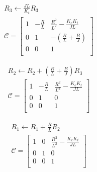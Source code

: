 \begin{equation*}
  \begin{aligned}
    &R_3 \leftarrow \tfrac{JL}{K_t} R_3\\
    &\mathcal{C} = 
    \begin{bmatrix}
      1           &  -\frac{R}{L}     &  \frac{R^2}{L^2}-\frac{K_e K_t}{JL}    \\
      0           &   1               &  -\left(\frac{R}{L}+\frac{B}{J}\right) \\
      0           &   0               &  1                                     \\
    \end{bmatrix}
  \end{aligned}
\end{equation*}

\begin{equation*}
  \begin{aligned}
    &R_2 \leftarrow R_2 + \left(\frac{R}{L}+\frac{B}{J}\right) R_3\\
    &\mathcal{C} = 
    \begin{bmatrix}
      1           &  -\frac{R}{L}     &  \frac{R^2}{L^2}-\frac{K_e K_t}{JL}    \\
      0           &   1               &  0                                     \\
      0           &   0               &  1                                     \\
    \end{bmatrix}
  \end{aligned}
\end{equation*}

\begin{equation*}
  \begin{aligned}
    &R_1 \leftarrow R_1 + \tfrac{R}{L} R_2\\
    &\mathcal{C} = 
    \begin{bmatrix}
      1           &   0               &  \frac{R^2}{L^2}-\frac{K_e K_t}{JL}    \\
      0           &   1               &  0                                     \\
      0           &   0               &  1                                     \\
    \end{bmatrix}
  \end{aligned}
\end{equation*}


